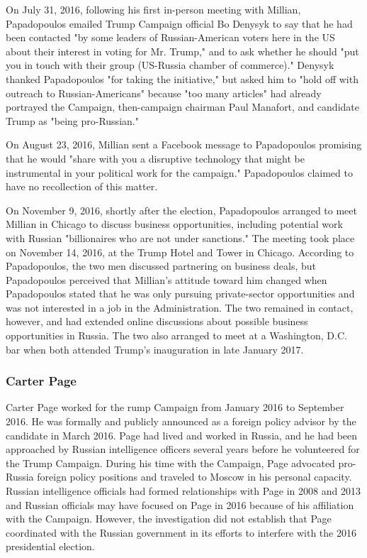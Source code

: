 On July 31, 2016, following his first in-person meeting with Millian, Papadopoulos emailed Trump Campaign official Bo Denysyk to say that he had been contacted "by some leaders of Russian-American voters here in the US about their interest in voting for Mr. Trump," and to ask whether he should "put you in touch with their group (US-Russia chamber of commerce)."%
Denysyk thanked Papadopoulos "for taking the initiative," but asked him to "hold off with outreach to Russian-Americans" because "too many articles" had already portrayed the Campaign, then-campaign chairman Paul Manafort, and candidate Trump as "being pro-Russian."%

On August 23, 2016, Millian sent a Facebook message to Papadopoulos promising that he would "share with you a disruptive technology that might be instrumental in your political work for the campaign."%
Papadopoulos claimed to have no recollection of this matter.%

On November 9, 2016, shortly after the election, Papadopoulos arranged to meet Millian in Chicago to discuss business opportunities, including potential work with Russian "billionaires who are not under sanctions."%
The meeting took place on November 14, 2016, at the Trump Hotel and Tower in Chicago.%
According to Papadopoulos, the two men discussed partnering on business deals, but Papadopoulos perceived that Millian's attitude toward him changed when Papadopoulos stated that he was only pursuing private-sector opportunities and was not interested in a job in the Administration.%
The two remained in contact, however, and had extended online discussions about possible business opportunities in Russia.%
The two also arranged to meet at a Washington, D.C. bar when both attended Trump's inauguration in late January 2017.%

\subsubsection{Carter Page}

Carter Page worked for the rump Campaign from January 2016 to September 2016.
He was formally and publicly announced as a foreign policy advisor by the candidate in March 2016.%
Page had lived and worked in Russia, and he had been approached by Russian intelligence officers several years before he volunteered for the Trump Campaign.
During his time with the Campaign, Page advocated pro-Russia foreign policy positions and traveled to Moscow in his personal capacity.
Russian intelligence officials had formed relationships with Page in 2008 and 2013 and Russian officials may have focused on Page in 2016 because of his affiliation with the Campaign.
However, the investigation did not establish that Page coordinated with the Russian government in its efforts to interfere with the 2016 presidential election.

